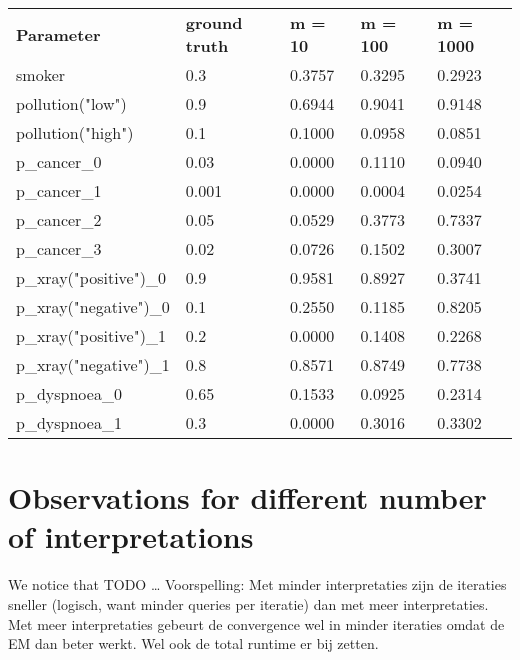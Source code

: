 \begin{table}[H]
    \centering
    \begin{tabular}{l|l|l|l|l|}
        \textbf{Parameter} & \textbf{ground truth} & \textbf{m = 10} & \textbf{m = 100} & \textbf{m = 1000} \\
        \cline{1-5}

        smoker                 & 0.3   & 0.3757 & 0.3295 & 0.2923 \\
        pollution("low")       & 0.9   & 0.6944 & 0.9041 & 0.9148 \\
        pollution("high")      & 0.1   & 0.1000 & 0.0958 & 0.0851 \\
        p\_cancer\_0           & 0.03  & 0.0000 & 0.1110 & 0.0940 \\
        p\_cancer\_1           & 0.001 & 0.0000 & 0.0004 & 0.0254 \\
        p\_cancer\_2           & 0.05  & 0.0529 & 0.3773 & 0.7337 \\
        p\_cancer\_3           & 0.02  & 0.0726 & 0.1502 & 0.3007 \\
        p\_xray("positive")\_0 & 0.9   & 0.9581 & 0.8927 & 0.3741 \\
        p\_xray("negative")\_0 & 0.1   & 0.2550 & 0.1185 & 0.8205 \\
        p\_xray("positive")\_1 & 0.2   & 0.0000 & 0.1408 & 0.2268 \\
        p\_xray("negative")\_1 & 0.8   & 0.8571 & 0.8749 & 0.7738 \\
        p\_dyspnoea\_0         & 0.65  & 0.1533 & 0.0925 & 0.2314 \\
        p\_dyspnoea\_1         & 0.3   & 0.0000 & 0.3016 & 0.3302 \\

    \end{tabular}
\end{table}

\section{Observations for different number of interpretations}
We notice that TODO \ldots
Voorspelling: Met minder interpretaties zijn de iteraties sneller (logisch, want minder queries per iteratie) dan met meer interpretaties. Met meer interpretaties gebeurt de convergence wel in minder iteraties omdat de EM dan beter werkt. Wel ook de total runtime er bij zetten.